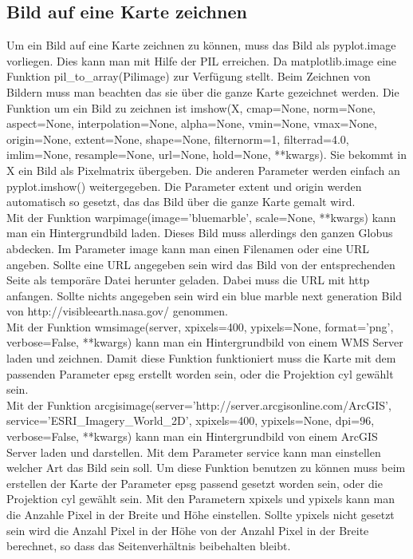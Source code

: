 \subsection{Bild auf eine Karte zeichnen}\label{bilder} 
Um ein Bild auf eine Karte zeichnen zu können, muss das Bild als \textsf{pyplot.image} vorliegen. Dies kann man mit Hilfe der \textsf{PIL} erreichen. Da \textsf{matplotlib.image} eine Funktion \textsf{pil\_to\_array(Pilimage)} zur Verfügung stellt. Beim Zeichnen von Bildern muss man beachten das sie über die ganze Karte gezeichnet werden. Die Funktion um ein Bild zu zeichnen ist \textsf{imshow(X, cmap=None, norm=None, aspect=None, interpolation=None, alpha=None, vmin=None, vmax=None, origin=None, extent=None, shape=None, filternorm=1, filterrad=4.0, imlim=None, resample=None, url=None, hold=None, **kwargs)}. Sie bekommt in \textsf{X} ein Bild als Pixelmatrix übergeben. Die anderen Parameter werden einfach an \textsf{pyplot.imshow()} weitergegeben. Die Parameter \textsf{extent} und \textsf{origin} werden automatisch so gesetzt, das das Bild über die ganze Karte gemalt wird.\\
Mit der Funktion \textsf{warpimage(image='bluemarble', scale=None, **kwargs)} kann man ein Hintergrundbild laden. Dieses Bild muss allerdings den ganzen Globus abdecken. Im Parameter \textsf{image} kann man einen Filenamen oder eine URL angeben. Sollte eine URL angegeben sein wird das Bild von der entsprechenden Seite als temporäre Datei herunter geladen. Dabei muss die URL mit \textsf{http} anfangen. Sollte nichts angegeben sein wird ein \textsf{blue marble next generation} Bild von  
\textsf{http://visibleearth.nasa.gov/} genommen.\\
Mit der Funktion \textsf{wmsimage(server, xpixels=400, ypixels=None, format='png', verbose=False, **kwargs)} kann man ein Hintergrundbild von einem WMS Server laden und zeichnen. Damit diese Funktion funktioniert muss die Karte mit dem passenden Parameter \textsf{epsg} erstellt worden sein, oder die Projektion \textsf{cyl} gewählt sein.\\
Mit der Funktion \textsf{arcgisimage(server='http://server.arcgisonline.com/ArcGIS', service='ESRI\_Imagery\_World\_2D', xpixels=400, ypixels=None, dpi=96, verbose=False, **kwargs)} kann man ein Hintergrundbild von einem ArcGIS Server laden und darstellen. Mit dem Parameter \textsf{service} kann man einstellen welcher Art das Bild sein soll. Um diese Funktion benutzen zu können muss beim erstellen der Karte der Parameter \textsf{epsg} passend gesetzt worden sein, oder die Projektion \textsf{cyl} gewählt sein. Mit den Parametern \textsf{xpixels} und \textsf{ypixels} kann man die Anzahle Pixel in der Breite und Höhe einstellen. Sollte \textsf{ypixels} nicht gesetzt sein wird die Anzahl Pixel in der Höhe von der Anzahl Pixel in der Breite berechnet, so dass das Seitenverhältnis beibehalten bleibt.\\
